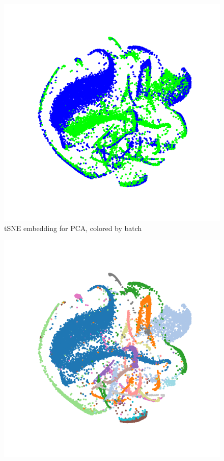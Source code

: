 \begin{suppfigure}[htp]
  \centering
  \begin{subfigure}[b]{0.3\textwidth}
        \includegraphics[width=\textwidth]{figures/PCA_tSNE_bipolar_batch.png}
        \caption{tSNE embedding for PCA, colored by batch}
    \end{subfigure}
\hspace{5pt}
  \begin{subfigure}[b]{0.3\textwidth}
        \includegraphics[width=\textwidth]{figures/PCA_tSNE_bipolar_clusters.png}

\end{subfigure}
\end{suppfigure}
